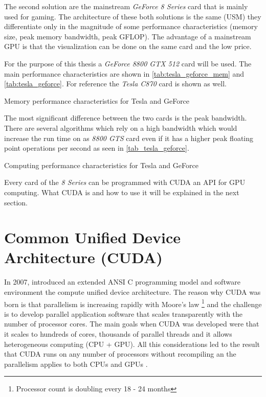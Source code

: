 The second solution are the mainstream \emph{GeForce 8 Series} card that
is mainly used for gaming. The architecture of these both solutions is the same
(\gls{USM}) they differentiate only in the magnitude of some performance
characteristics (memory size, peak memory bandwidth, peak \gls{GFLOP}). The
advantage of a mainstream \gls{GPU} is that the visualization can be done on the
same card and the low price. 

For the purpose of this thesis a \emph{GeForce 8800 GTX 512} card will be
used. The main performance characteristics are shown in
\autoref{tab:tesla_geforce_mem} and \autoref{tab:tesla_geforce}. For reference
the \emph{Tesla C870} card is shown as well.

\begin{table}[ht]
	\centering
  	\caption{Memory performance characteristics for Tesla and GeForce}
  	\label{tab:tesla_geforce_mem}
\end{table}

The most significant difference between the two cards is the peak bandwidth. There
are several algorithms which rely on a high bandwidth which would increase the
run time on as \emph{8800 GTS} card even if it has a higher peak floating
point operations per second as seen in  \autoref{tab_tesla_geforce}. 

\begin{table}[ht]
	\centering
  	\caption{Computing performance characteristics for Tesla and GeForce}
  	\label{tab:tesla_geforce}
\end{table}

Every card of the \emph{8 Series} can be programmed with \gls{CUDA} an
\gls{API} for \gls{GPU} computing. What \gls{CUDA} is and how to use it will 
be explained in the next section. 


\section{Common Unified Device Architecture (CUDA)}%
\label{sub:common_unified_device_architecture_cuda_} 
In 2007, {} introduced an extended \gls{ANSI} C programming model and
software environment the compute unified device architecture. The reason why
\gls{CUDA} was born is that parallelism is increasing rapidly with Moore's law
\footnote{Processor count is doubling every 18 - 24 months} and the challenge is
to develop parallel application software that scales transparently with the
number of processor cores. The main goals when \gls{CUDA} was developed were
that it scales to hundreds of cores, thousands of parallel threads and it allows
heterogeneous computing (\gls{CPU} + \gls{GPU}). All this considerations led to
the result that \gls{CUDA} runs on any number of processors without recompiling
an the parallelism applies to both \glspl{CPU} and \glspl{GPU} 
\citep{citeulike:3839013}.

